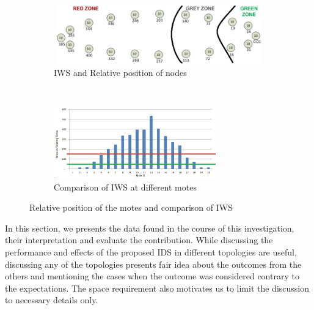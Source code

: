\documentclass[conference,final]{IEEEtran}
\newcommand{\notedme}[1]{\raisebox{0pt}[0pt][0pt]{\pdfcomment[open=true,color=blue]{#1}}}
\begin{document}
\begin{figure}[t!]
    \centering
    \begin{subfigure}[b]{0.5\textwidth}
        \centering
        \includegraphics[height=1in, width=4in]{Elliptical}
        \caption{IWS and Relative position of nodes}
        \label{subfig:elliptopo} %
    \end{subfigure}%
    ~ 
    \begin{subfigure}[b]{0.5\textwidth}
        \centering
        \includegraphics[height=1.2in]{Elliptical_column}
        \caption{Comparison of IWS at different motes}
        \label{subfig:ellipgraph} %
    \end{subfigure}
    \caption{Relative position of the motes and comparison of IWS }
    \label{fig:ellip} %
\end{figure}

In this section, we presents the data found in the course of this investigation, their interpretation and evaluate the contribution.
While discussing the performance and effects of the proposed IDS in different topologies are useful, discussing any of the topologies presents fair idea about the outcomes from the others and mentioning the cases when the outcome was considered  contrary to the expectations.
The space requirement also motivates us to limit the discussion to necessary details only.


\end{document}
